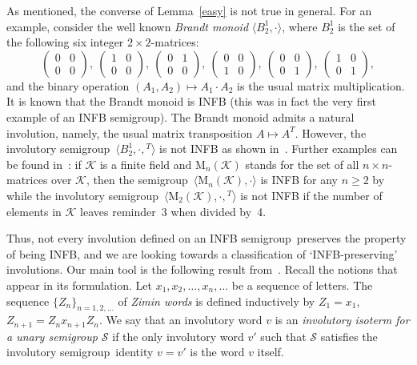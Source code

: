 \documentclass[smallextended]{svjour3}
\newcommand{\sgp}{semi\-group}
\newcommand{\is}{involutory semi\-group}
\begin{document}
As mentioned, the converse of Lemma~\ref{easy} is not true in general. For an example, consider the well known \emph{Brandt monoid}
$\langle B_2^1,\cdot\rangle$, where $B_2^1$ is the set of the following six integer $2\times 2$-matrices:
$$\begin{pmatrix} 0 & 0\\ 0 & 0\end{pmatrix},\
\begin{pmatrix} 1 & 0\\ 0 & 0\end{pmatrix},\
\begin{pmatrix} 0 & 1\\ 0 & 0\end{pmatrix},\
\begin{pmatrix} 0 & 0\\ 1 & 0\end{pmatrix},\
\begin{pmatrix} 0 & 0\\ 0 & 1\end{pmatrix},\
\begin{pmatrix} 1 & 0\\ 0 & 1\end{pmatrix},$$
and the binary operation $(A_1,A_2)\mapsto A_1\cdot A_2$ is the usual matrix multiplication. It is known
\cite[Corollary~6.1]{sapirburnside} that the Brandt monoid is INFB (this was in fact the very first example of an INFB \sgp). The Brandt
monoid admits a natural involution, namely, the usual matrix transposition $A\mapsto A^T$. However, the \is\ $\langle
B_2^1,\cdot,{}^T\rangle$ is not INFB as shown in~\cite{Sapir:1993}. Further examples can be found in~\cite{ADV:2012}: if $\mathcal{K}$ is a
finite field and $\mathrm{M}_n(\mathcal{K})$ stands for the set of all $n\times n$-matrices over $\mathcal{K}$, then the \sgp\
$\langle\mathrm{M}_n(\mathcal{K}),\cdot\rangle$ is INFB for any $n\ge 2$ by \cite[Corollary~6.2]{sapirburnside} while the \is\
$\langle\mathrm{M}_2(\mathcal{K}),\cdot,{}^T\rangle$ is not INFB if the number of elements in $\mathcal{K}$ leaves reminder~3 when divided
by~4.

Thus, not every involution defined on an INFB \sgp\ preserves the property of being INFB, and we are looking towards a classification of
`INFB-preserving' involutions. Our main tool is the following result from~\cite{ADV:2012}. Recall the notions that appear in its
formulation. Let $x_1,x_2,\dots,x_n,\dots$ be a sequence of letters. The sequence $\{Z_n\}_{n=1,2,\dots}$ of \emph{Zimin words} is defined
inductively by $Z_1=x_1$, $Z_{n+1}=Z_nx_{n+1}Z_n$. We say that an involutory word $v$ is an \emph{involutory isoterm for a unary semigroup
$\mathcal{S}$} if the only involutory word $v'$ such that $\mathcal{S}$ satisfies the \is\ identity $v=v'$ is the word $v$ itself.
\end{document}
